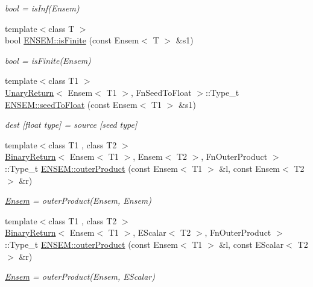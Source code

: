 \begin{DoxyCompactItemize}
\begin{DoxyCompactList}\small\item\em bool = is\+Inf(\+Ensem) \end{DoxyCompactList}\item 
{\footnotesize template$<$class T $>$ }\\bool \mbox{\hyperlink{group__eensem_ga13016a14218fbe75f26f9acd37e1efe5}{E\+N\+S\+E\+M\+::is\+Finite}} (const Ensem$<$ T $>$ \&s1)
\begin{DoxyCompactList}\small\item\em bool = is\+Finite(\+Ensem) \end{DoxyCompactList}\item 
{\footnotesize template$<$class T1 $>$ }\\\mbox{\hyperlink{structUnaryReturn}{Unary\+Return}}$<$ Ensem$<$ T1 $>$, Fn\+Seed\+To\+Float $>$\+::Type\+\_\+t \mbox{\hyperlink{group__eensem_ga92fac3bc9ad6164daf90b83052f0d48e}{E\+N\+S\+E\+M\+::seed\+To\+Float}} (const Ensem$<$ T1 $>$ \&s1)
\begin{DoxyCompactList}\small\item\em dest \mbox{[}float type\mbox{]} = source \mbox{[}seed type\mbox{]} \end{DoxyCompactList}\item 
{\footnotesize template$<$class T1 , class T2 $>$ }\\\mbox{\hyperlink{structBinaryReturn}{Binary\+Return}}$<$ Ensem$<$ T1 $>$, Ensem$<$ T2 $>$, Fn\+Outer\+Product $>$\+::Type\+\_\+t \mbox{\hyperlink{group__eensem_ga2e9659bc245cd1b2e76ef274c78e26a3}{E\+N\+S\+E\+M\+::outer\+Product}} (const Ensem$<$ T1 $>$ \&l, const Ensem$<$ T2 $>$ \&r)
\begin{DoxyCompactList}\small\item\em \mbox{\hyperlink{classENSEM_1_1Ensem}{Ensem}} = outer\+Product(\+Ensem, Ensem) \end{DoxyCompactList}\item 
{\footnotesize template$<$class T1 , class T2 $>$ }\\\mbox{\hyperlink{structBinaryReturn}{Binary\+Return}}$<$ Ensem$<$ T1 $>$, E\+Scalar$<$ T2 $>$, Fn\+Outer\+Product $>$\+::Type\+\_\+t \mbox{\hyperlink{group__eensem_ga13dd888cacbe0e5a3c85217eeb2c9002}{E\+N\+S\+E\+M\+::outer\+Product}} (const Ensem$<$ T1 $>$ \&l, const E\+Scalar$<$ T2 $>$ \&r)
\begin{DoxyCompactList}\small\item\em \mbox{\hyperlink{classENSEM_1_1Ensem}{Ensem}} = outer\+Product(\+Ensem, E\+Scalar) \end{DoxyCompactList}\item 

\end{DoxyCompactItemize}
